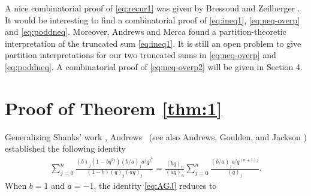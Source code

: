 \documentclass[12pt]{article}
\theoremstyle{remark}
\numberwithin{equation}{section}
\begin{document}
A nice combinatorial proof of \eqref{eq:recur1} was given by Bressoud
and Zeilberger \cite{BZ}.  It would be interesting to find a
combinatorial proof of \eqref{eq:ineq1}, \eqref{eq:neq-overp} and \eqref{eq:poddneq}.
Moreover, Andrews and Merca \cite{AM}
found  a partition-theoretic interpretation of the truncated sum \eqref{eq:ineq1}.
It is still an open problem  to give partition  interpretations for our two truncated sums
in \eqref{eq:neq-overp} and \eqref{eq:poddneq}.
A combinatorial proof of \eqref{eq:neq-overp2} will be given in Section 4.

\section{Proof of Theorem \ref{thm:1}}
Generalizing Shanks' work \cite{Shanks,Shanks2},
Andrews~\cite[Lemma 2]{Andrews86} (see also Andrews, Goulden, and Jackson \cite[Theorem 1]{AGJ}) established the following identity
\begin{align}
\sum_{j=0}^n \frac{(b)_{j}(1-bq^{2j})(b/a)_j a^j q^{j^2}}{(1-b)(q)_j (aq)_j}
=\frac{(bq)_n}{(aq)_n}\sum_{j=0}^n \frac{(b/a)_j a^j q^{(n+1)j}}{(q)_j}. \label{eq:AGJ}
\end{align}
When $b=1$ and $a=-1$, the identity \eqref{eq:AGJ} reduces to
\end{document}
